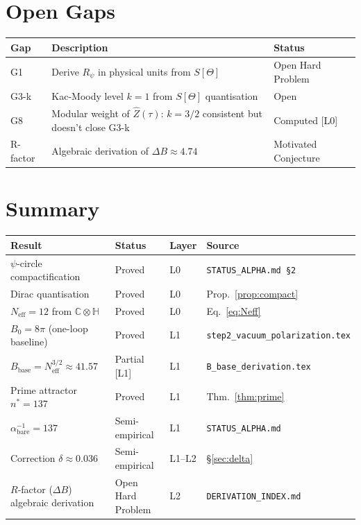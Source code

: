 \documentclass[11pt,a4paper]{article}
\theoremstyle{definition}
\theoremstyle{remark}
\begin{document}
\section{Open Gaps}\label{sec:gaps}

\begin{center}
\begin{longtable}{lll}
\toprule
Gap & Description & Status \\
\midrule
G1 & Derive $R_\psi$ in physical units from $S[\Theta]$ &
  Open Hard Problem \\
G3-k & Kac-Moody level $k=1$ from $S[\Theta]$ quantisation &
  Open \\
G8 & Modular weight of $\hat{Z}(\tau)$: $k=3/2$ consistent but doesn't
  close G3-k & Computed [L0] \\
R-factor & Algebraic derivation of $\Delta B \approx 4.74$ &
  Motivated Conjecture \\
\bottomrule
\end{longtable}
\end{center}

\section{Summary}\label{sec:summary_alpha}

\begin{center}
\begin{longtable}{llll}
\toprule
Result & Status & Layer & Source \\
\midrule
$\psi$-circle compactification & Proved & L0 &
  \texttt{STATUS\_ALPHA.md \S2} \\
Dirac quantisation & Proved & L0 &
  Prop.~\ref{prop:compact} \\
$N_{\mathrm{eff}} = 12$ from $\mathbb{C}\otimes\mathbb{H}$ & Proved & L0 &
  Eq.~\eqref{eq:Neff} \\
$B_0 = 8\pi$ (one-loop baseline) & Proved & L1 &
  \texttt{step2\_vacuum\_polarization.tex} \\
$B_{\mathrm{base}} = N_{\mathrm{eff}}^{3/2} \approx 41.57$ & Partial [L1] &
  L1 & \texttt{B\_base\_derivation.tex} \\
Prime attractor $n^* = 137$ & Proved & L1 &
  Thm.~\ref{thm:prime} \\
$\alpha^{-1}_{\mathrm{bare}} = 137$ & Semi-empirical & L1 &
  \texttt{STATUS\_ALPHA.md} \\
Correction $\delta \approx 0.036$ & Semi-empirical & L1--L2 &
  \S\ref{sec:delta} \\
$R$-factor ($\Delta B$) algebraic derivation & Open Hard Problem & L2 &
  \texttt{DERIVATION\_INDEX.md} \\
\bottomrule
\end{longtable}
\end{center}
\end{document}
